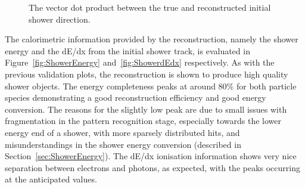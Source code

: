 \begin{figure}
\begin{minipage}[t]{0.48\linewidth}
    \caption[The vector dot product between the true and reconstructed initial shower direction.]{The vector dot product between the true and reconstructed initial shower direction.}
    \label{fig:ShowerDirection}
  \end{minipage}
\end{figure}

The calorimetric information provided by the reconstruction, namely the shower energy and the dE/dx from the initial shower track, is evaluated in Figure~\ref{fig:ShowerEnergy} and~\ref{fig:ShowerdEdx} respectively.  As with the previous validation plots, the reconstruction is shown to produce high quality shower objects.  The energy completeness peaks at around 80\% for both particle species demonstrating a good reconstruction efficiency and good energy conversion.  The reasons for the slightly low peak are due to small issues with fragmentation in the pattern recognition stage, especially towards the lower energy end of a shower, with more sparsely distributed hits, and misunderstandings in the shower energy conversion (described in Section~\ref{sec:ShowerEnergy}).  The dE/dx ionisation information shows very nice separation between electrons and photons, as expected, with the peaks occurring at the anticipated values.


